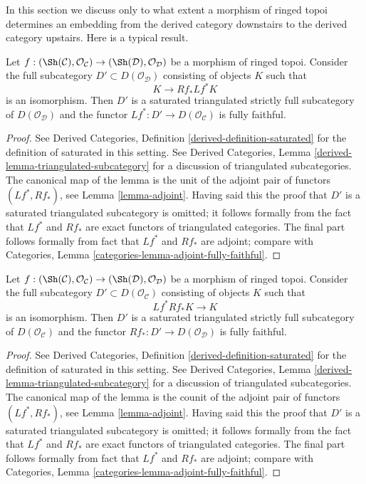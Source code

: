 \noindent
In this section we discuss only to what extent a morphism
of ringed topoi determines an embedding from the derived
category downstairs to the derived category upstairs.
Here is a typical result.

\begin{lemma}
\label{lemma-downstairs}
Let $f : (\Sh(\mathcal{C}), \mathcal{O}_\mathcal{C}) \to
(\Sh(\mathcal{D}), \mathcal{O}_\mathcal{D})$ be a morphism of ringed topoi.
Consider the full subcategory $D' \subset D(\mathcal{O}_\mathcal{D})$
consisting of objects $K$ such that
$$
K \longrightarrow Rf_*Lf^*K
$$
is an isomorphism. Then $D'$ is a saturated triangulated strictly full
subcategory of $D(\mathcal{O}_\mathcal{D})$ and the functor
$Lf^* : D' \to D(\mathcal{O}_\mathcal{C})$ is fully faithful.
\end{lemma}

\begin{proof}
See Derived Categories, Definition \ref{derived-definition-saturated}
for the definition of saturated in this setting. See
Derived Categories, Lemma \ref{derived-lemma-triangulated-subcategory}
for a discussion of triangulated subcategories.
The canonical map of the lemma is the unit of the adjoint
pair of functors $(Lf^*, Rf_*)$, see Lemma \ref{lemma-adjoint}.
Having said this the proof that $D'$ is a saturated triangulated subcategory
is omitted; it follows formally from the fact that
$Lf^*$ and $Rf_*$ are exact functors of triangulated categories.
The final part follows formally from
fact that $Lf^*$ and $Rf_*$ are adjoint; compare with
Categories, Lemma \ref{categories-lemma-adjoint-fully-faithful}.
\end{proof}

\begin{lemma}
\label{lemma-upstairs}
Let $f : (\Sh(\mathcal{C}), \mathcal{O}_\mathcal{C}) \to
(\Sh(\mathcal{D}), \mathcal{O}_\mathcal{D})$ be a morphism of ringed topoi.
Consider the full subcategory $D' \subset D(\mathcal{O}_\mathcal{C})$
consisting of objects $K$ such that
$$
Lf^*Rf_*K \longrightarrow K
$$
is an isomorphism. Then $D'$ is a saturated triangulated strictly full
subcategory of $D(\mathcal{O}_\mathcal{C})$ and the functor
$Rf_* : D' \to D(\mathcal{O}_\mathcal{D})$ is fully faithful.
\end{lemma}

\begin{proof}
See Derived Categories, Definition \ref{derived-definition-saturated}
for the definition of saturated in this setting. See
Derived Categories, Lemma \ref{derived-lemma-triangulated-subcategory}
for a discussion of triangulated subcategories.
The canonical map of the lemma is the counit of the adjoint
pair of functors $(Lf^*, Rf_*)$, see Lemma \ref{lemma-adjoint}.
Having said this the proof that $D'$ is a saturated triangulated subcategory
is omitted; it follows formally from the fact that
$Lf^*$ and $Rf_*$ are exact functors of triangulated categories.
The final part follows formally from
fact that $Lf^*$ and $Rf_*$ are adjoint; compare with
Categories, Lemma \ref{categories-lemma-adjoint-fully-faithful}.
\end{proof}

